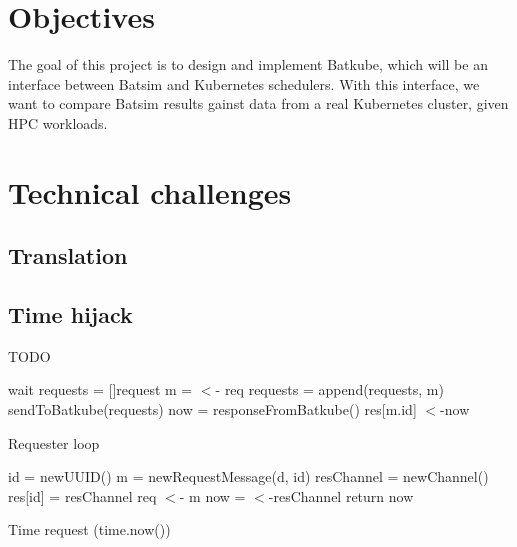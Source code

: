 \documentclass[12pt, a4paper]{memoir}
\begin{document}
\section{Objectives}

The goal of this project is to design and implement Batkube, which will be an
interface between Batsim and Kubernetes schedulers. With this interface, we
want to compare Batsim results gainst data from a real Kubernetes cluster,
given HPC workloads.

\section{Technical challenges}
\subsection{Translation}
\subsection{Time hijack}
TODO



\begin{algorithm}[H]
\DontPrintSemicolon
{}
 {
	wait\;
}
requests = []request\;
 {
	m = $<$- req 
	requests = append(requests, m)\;
}
sendToBatkube(requests) 
now = responseFromBatkube()\;
 {
	res[m.id] $<$-now 
}

	
\caption{Requester loop}
\label{alg:reqLoop}
\end{algorithm}


\begin{algorithm}[H]
\DontPrintSemicolon
{}

id = newUUID()\;
m = newRequestMessage(d, id) 
resChannel = newChannel()\;
res[id] = resChannel 
req $<$- m 
now = $<$-resChannel 
return now\;
\caption{Time request (time.now())}
\label{alg:now}
\end{algorithm}
\end{document}
